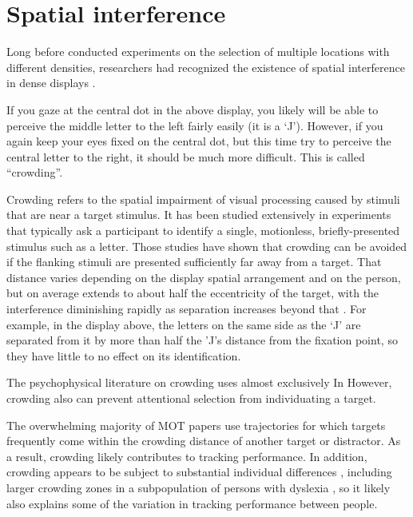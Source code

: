 \documentclass[]{book}
\begin{document}
\hypertarget{spatial-interference-1}{%
\chapter{Spatial interference}\label{spatial-interference-1}}

Long before \citet{franconeriHowManyLocations2007} conducted experiments on the selection of multiple locations with different densities, researchers had recognized the existence of spatial interference in dense displays \citep{wolfordPerturbationModelLetter1975, korteUberGestaltauffassungIm1923, strasburgerDancingLettersTicks2014}.

\hypertarget{htmlwidget-4d8d17bd518ed857095e}{}

If you gaze at the central dot in the above display, you likely will be able to perceive the middle letter to the left fairly easily (it is a `J'). However, if you again keep your eyes fixed on the central dot, but this time try to perceive the central letter to the right, it should be much more difficult. This is called ``crowding''.

Crowding refers to the spatial impairment of visual processing caused by stimuli that are near a target stimulus. It has been studied extensively in experiments that typically ask a participant to identify a single, motionless, briefly-presented stimulus such as a letter. Those studies have shown that crowding can be avoided if the flanking stimuli are presented sufficiently far away from a target. That distance varies depending on the display spatial arrangement and on the person, but on average extends to about half the eccentricity of the target, with the interference diminishing rapidly as separation increases beyond that \citep{boumaInteractionEffectsParafoveal1970a, gurnseyCrowdingSizeEccentricity2011}. For example, in the display above, the letters on the same side as the `J' are separated from it by more than half the 'J's distance from the fixation point, so they have little to no effect on its identification.

The psychophysical literature on crowding uses almost exclusively
In However, crowding also can prevent attentional selection from individuating a target. \citep{intriligatorSpatialResolutionVisual2001}

The overwhelming majority of MOT papers use trajectories for which targets frequently come within the crowding distance of another target or distractor. As a result, crowding likely contributes to tracking performance. In addition, crowding appears to be subject to substantial individual differences \citep{petrovAsymmetriesIdiosyncraticHot2011}, including larger crowding zones in a subpopulation of persons with dyslexia \citet{jooOptimizingTextIndividual2018}, so it likely also explains some of the variation in tracking performance between people.
\end{document}
